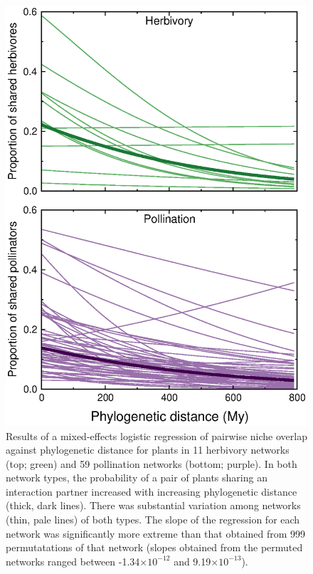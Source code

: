 \documentclass[12pt]{article}
\begin{document}
  \begin{figure}[!h]
    \begin{center}
      \centerline{\includegraphics*[width=.5\textwidth]{Figures/dataplots/scaled_regression_lines_full_color.eps}}
    \end{center}
     \caption{Results of a mixed-effects logistic regression of pairwise niche overlap
     against phylogenetic distance for plants in 11
     herbivory networks (top; green) and 59 pollination
     networks (bottom; purple). In both network types, the probability of a pair of plants
     sharing an interaction partner increased with increasing phylogenetic distance (thick,
     dark lines). There was substantial variation among networks (thin, pale lines) of both types. The slope of the regression for each network was significantly more extreme than that obtained from 999 permutatations of that network (slopes obtained from the permuted networks ranged between -1.34$\times10^{-12}$ and 9.19$\times10^{-13}$).}
    \label{within_network_regression} 
  \end{figure}
\end{document}

